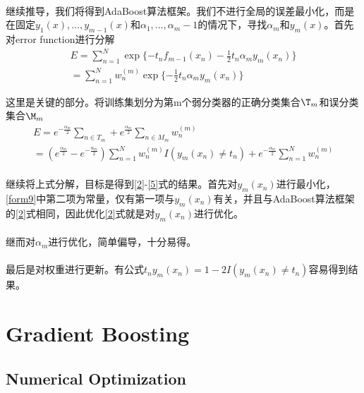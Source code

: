 \documentclass[a4paper]{article}
\begin{document}
\paragraph{}
继续推导，我们将得到AdaBoost算法框架。我们不进行全局的误差最小化，而是在固定$y_1(x),\dots,y_{m-1}(x)$和$\alpha_1,\dots,\alpha_m-1$的情况下，寻找$\alpha_m$和$y_m(x)$。首先对error function进行分解
\begin{equation}
  \label{form8}
  \begin{split}
  E=\sum_{n=1}^N \exp\{-t_n f_{m-1}(x_n) - \frac{1}{2} t_n \alpha_m y_m(x_n)\}\\
  =\sum_{n=1}^N w_{n}^{(m)} \exp \{-\frac{1}{2} t_n \alpha_m y_m(x_n)\}
\end{split}
\end{equation}

这里是关键的部分。将训练集划分为第m个弱分类器的正确分类集合$\T_m$和误分类集合$\M_m$
\begin{equation}
  \label{form9}
  \begin{split}
	E=e^{-\frac{\alpha_m}{2}}\sum_{n \in T_m}+e^{\frac{\alpha_m}{2}}\sum_{n \in M_m}w_{n}^{(m)} \\
	=(e^{\frac{\alpha_m}{2}} - e^{-\frac{\alpha_m}{2}})\sum_{n=1}^{N}w_{n}^{(m)}I(y_m(x_n) \neq t_n) + e^{-\frac{\alpha_m}{2}}\sum_{n=1}^{N}w_{n}^{(m)}
  \end{split}
\end{equation}

\paragraph{}继续将上式分解，目标是得到\ref{2}-\ref{5}式的结果。首先对$y_m(x_n)$进行最小化，\ref{form9}中第二项为常量，仅有第一项与$y_m(x_n)$有关，并且与AdaBoost算法框架的\ref{2}式相同，因此优化\ref{2}式就是对$y_m(x_n)$进行优化。
\paragraph{}继而对$\alpha_m$进行优化，简单偏导，十分易得。
\paragraph{}最后是对权重进行更新。有公式$t_ny_m(x_n)=1-2I(y_m(x_n)\neq t_n)$容易得到结果。

\section{Gradient Boosting}
\subsection{Numerical Optimization}
\end{document}
